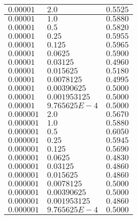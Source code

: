 \begin{enumerate}
\begin{longtable}{| p{}  |  p{} |p{}  |}
      $0.00001$ & $2.0$ & $0.5525$ \\
      \hline
      $0.00001$ & $1.0$ & $0.5880$ \\
      \hline
      $0.00001$ & $0.5$ & $0.5820$ \\
      \hline
      $0.00001$ & $0.25$ & $0.5955$ \\
      \hline
      $0.00001$ & $0.125$ & $0.5965$ \\
      \hline
      $0.00001$ & $0.0625$ & $0.5900$ \\
      \hline
      $0.00001$ & $0.03125$ & $0.4960$ \\
      \hline
      $0.00001$ & $0.015625$ & $0.5180$ \\
      \hline
      $0.00001$ & $0.0078125$ & $0.4995$ \\
      \hline
      $0.00001$ & $0.00390625$ & $0.5000$ \\
      \hline
      $0.00001$ & $0.001953125$ & $0.5000$ \\
      \hline
      $0.00001$ & $9.765625E-4$ & $0.5000$ \\
      \hline
      
      $0.000001$ & $2.0$ & $0.5670$ \\
      \hline
      $0.000001$ & $1.0$ & $0.5880$ \\
      \hline
      $0.000001$ & $0.5$ & $0.6050$ \\
      \hline
      $0.000001$ & $0.25$ & $0.5945$ \\
      \hline
      $0.000001$ & $0.125$ & $0.5690$ \\
      \hline
      $0.000001$ & $0.0625$ & $0.4830$ \\
      \hline
      $0.000001$ & $0.03125$ & $0.4860$ \\
      \hline
      $0.000001$ & $0.015625$ & $0.4860$ \\
      \hline
      $0.000001$ & $0.0078125$ & $0.5000$ \\
      \hline
      $0.000001$ & $0.00390625$ & $0.5000$ \\
      \hline
      $0.000001$ & $0.001953125$ & $0.4860$ \\
      \hline
      $0.000001$ & $9.765625E-4$ & $0.5000$ \\
      \hline
       

\end{longtable}
\end{enumerate}
